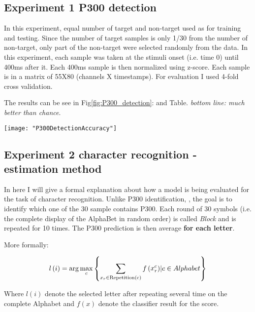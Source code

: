 \documentclass[]{report}
\begin{document}
\subsection{Experiment 1 P300 detection}

In this experiment, equal number of target and non-target used as for training and testing. Since the number of target samples is only 1/30 from the number of non-target, only part of the non-target were selected randomly from the data. In this experiment, each sample was taken at the stimuli onset (i.e. time 0) until 400ms after it. Each 400ms sample is then normalized using z-score. Each sample is in a matrix of 55X80 (channels X timestamps). For evaluation I used 4-fold cross validation.

The results can be see in  Fig\ref{fig:P300_detection}: and Table. \textit{bottom line: much better than chance}. 

\begin{figure*}[h]
	\texttt{[image: "P300DetectionAccuracy"]}
	\caption{P300 detection accuracy per subject}
	\label{fig:P300_detection}
\end{figure*}






\subsection{Experiment 2 character recognition - estimation method}
In here I will give a formal explanation about how a model is being evaluated for the task of character recognition. Unlike P300 identification, , the goal is to identify which one of the 30 sample contains P300. Each round of 30 symbols (i.e. the complete display of the AlphaBet in random order) is called \textit{Block} and is repeated for 10 times. The P300 prediction is then average \textbf{for each letter}.



More formally:

\newcommand{\argmin}{\operatornamewithlimits{argmin}}
\[l\left( i \right) = \arg {\max _c}\left\{ {\sum\limits_{{x_r} \in {\rm{Repetition(c)}}}^{} {f\left( {\mathop x\nolimits_r^c } \right)} |c \in Alphabet} \right\}\]



Where $l(i)$ denote the selected letter after repeating several time on the complete Alphabet and $f(x)$ denote the classifier result for the score.
\end{document}
